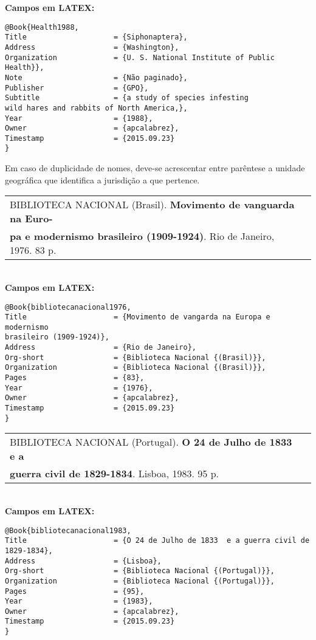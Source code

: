 \textbf{Campos em LATEX:}

\begin{verbatim}
@Book{Health1988,
Title                    = {Siphonaptera},
Address                  = {Washington},
Organization             = {U. S. National Institute of Public Health}},
Note                     = {Não paginado},
Publisher                = {GPO},
Subtitle                 = {a study of species infesting 
wild hares and rabbits of North America,},
Year                     = {1988},
Owner                    = {apcalabrez},
Timestamp                = {2015.09.23}
}
\end{verbatim}

Em caso de duplicidade de nomes, deve-se acrescentar entre parêntese a unidade geográfica que identifica a jurisdição a que pertence. \\


\begin{tabular}{|l|c|} \hline
	BIBLIOTECA NACIONAL (Brasil). \textbf{Movimento de vanguarda na Euro-} \\ \textbf{pa e modernismo brasileiro (1909-1924)}. Rio de Janeiro, 1976.	83 p.   \\\hline
\end{tabular}\\

\textbf{Campos em LATEX:}

\begin{verbatim}
@Book{bibliotecanacional1976,
Title                    = {Movimento de vangarda na Europa e modernismo
brasileiro (1909-1924)},
Address                  = {Rio de Janeiro},
Org-short                = {Biblioteca Nacional {(Brasil)}},
Organization             = {Biblioteca Nacional {(Brasil)}},
Pages                    = {83},
Year                     = {1976},
Owner                    = {apcalabrez},
Timestamp                = {2015.09.23}
}
\end{verbatim}

\begin{tabular}{|l|c|} \hline
	BIBLIOTECA NACIONAL (Portugal). \textbf{O 24 de Julho de 1833 e a} \\ \textbf{guerra civil de 1829-1834}. Lisboa, 1983. 95 p.   \\\hline
\end{tabular}\\

\textbf{Campos em LATEX:}

\begin{verbatim}
@Book{bibliotecanacional1983,
Title                    = {O 24 de Julho de 1833  e a guerra civil de 
1829-1834},
Address                  = {Lisboa},
Org-short                = {Biblioteca Nacional {(Portugal)}},
Organization             = {Biblioteca Nacional {(Portugal)}},
Pages                    = {95},
Year                     = {1983},
Owner                    = {apcalabrez},
Timestamp                = {2015.09.23}
}
\end{verbatim}

